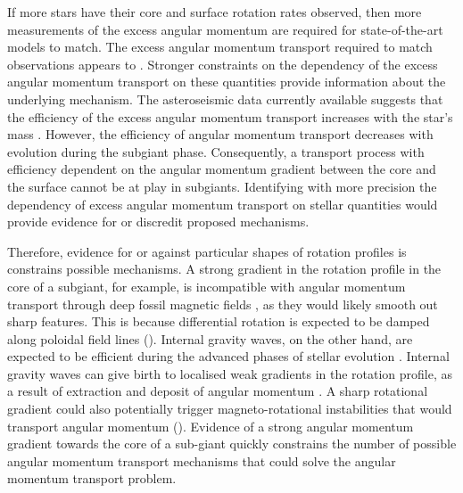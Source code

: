 If more stars have their core and surface rotation rates observed, then more measurements of the excess angular momentum are required for state-of-the-art models to match.
The excess angular momentum transport required to match observations appears to .
Stronger constraints on the dependency of the excess angular momentum transport on these quantities provide information about the underlying mechanism.
The \kepler{} asteroseismic data currently available suggests that the efficiency of the excess angular momentum transport increases with the star's mass \citep{eggenberger_asteroseismology_2019}.
However, the efficiency of angular momentum transport decreases with evolution during the subgiant phase.
Consequently, a transport process with efficiency dependent on the angular momentum gradient between the core and the surface cannot be at play in subgiants.
Identifying with more precision the dependency of excess angular momentum transport on stellar quantities would provide evidence for or discredit proposed mechanisms.

Therefore, evidence for or against particular shapes of rotation profiles is constrains possible mechanisms.
A strong gradient in the rotation profile in the core of a subgiant, for example, is incompatible with angular momentum transport through deep fossil magnetic fields \citep{gough_effect_1990}, as they would likely smooth out sharp features.
 This is because differential rotation is expected to be damped along poloidal field lines (\citealp{garaud_rotationally_2002, strugarek_magnetic_2011}).
 Internal gravity waves, on the other hand, are expected to be efficient during the advanced phases of stellar evolution \citep{charbonnel_deep_2008}. 
Internal gravity waves can give birth to localised weak gradients in the rotation profile, as a result of extraction and deposit of angular momentum \citep{charbonnel_influence_2005}. 
A sharp rotational gradient could also potentially trigger magneto-rotational instabilities that would transport angular momentum (\citealp{balbus_stability_1994,arlt_differential_2003,menou_magnetorotational_2006, fuller_asteroseismology_2015, fuller_slowing_2019,moyano_asteroseismology_2022}). 
Evidence of a strong angular momentum gradient towards the core of a sub-giant quickly constrains the number of possible angular momentum transport mechanisms that could solve the angular momentum transport problem.

